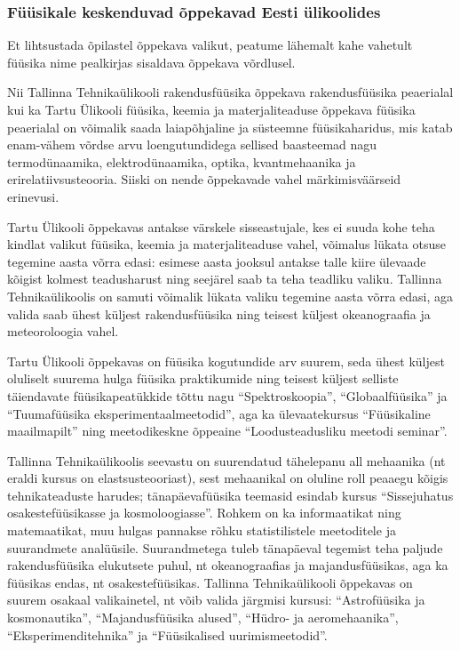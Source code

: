 \documentclass[11pt, twoside]{article}
\begin{document}
{{\subsubsection*{Füüsikale keskenduvad õppekavad Eesti ülikoolides}
Et lihtsustada õpilastel õppekava valikut, peatume lähemalt kahe vahetult füüsika nime pealkirjas sisaldava õppekava võrdlusel.

Nii Tallinna Tehnikaülikooli rakendusfüüsika õppekava rakendusfüüsika peaerialal kui ka Tartu Ülikooli füüsika, keemia ja materjaliteaduse õppekava füüsika
peaerialal on võimalik saada laiapõhjaline ja süsteemne füüsikaharidus, mis katab
enam-vähem võrdse arvu loengutundidega sellised baasteemad nagu termodünaamika, elektrodünaamika, optika,
kvantmehaanika ja erirelatiivsusteooria. Siiski on nende õppekavade vahel märkimisväärseid erinevusi.

Tartu Ülikooli õppekavas antakse värskele sisseastujale, kes ei suuda kohe teha kindlat valikut füüsika, keemia
ja materjaliteaduse vahel, võimalus lükata otsuse tegemine aasta võrra edasi: esimese aasta jooksul antakse talle
kiire ülevaade kõigist kolmest teadusharust ning seejärel saab ta teha teadliku valiku.
Tallinna Tehnikaülikoolis on samuti võimalik lükata valiku tegemine aasta võrra edasi, aga valida saab ühest küljest
rakendusfüüsika ning teisest küljest okeanograafia ja meteoroloogia vahel.

Tartu Ülikooli õppekavas on füüsika kogutundide arv suurem, seda ühest
küljest oluliselt suurema hulga füüsika praktikumide
ning teisest küljest selliste täiendavate füüsikapeatükkide tõttu nagu
``Spektroskoopia'', ``Globaalfüüsika''
ja ``Tuumafüüsika eksperimentaalmeetodid'', aga ka ülevaatekursus
``Füüsikaline maailmapilt'' ning meetodikeskne
õppeaine ``Loodusteadusliku meetodi seminar''.

Tallinna Tehnikaülikoolis seevastu on  suurendatud tähelepanu all
mehaanika (nt eraldi kursus on elastsusteooriast),
sest mehaanikal on oluline roll peaaegu kõigis tehnikateaduste
harudes; tänapäevafüüsika teemasid esindab kursus ``Sissejuhatus
osakestefüüsikasse ja kosmoloogiasse''. Rohkem on ka informaatikat ning
matemaatikat, muu hulgas pannakse rõhku statistilistele meetoditele ja
suurandmete analüüsile. Suurandmetega tuleb tänapäeval tegemist teha
paljude
rakendusfüüsika elukutsete puhul, nt okeanograafias ja majandusfüüsikas,
aga ka füüsikas endas, nt osakestefüüsikas.
Tallinna Tehnikaülikooli õppekavas on suurem osakaal valikainetel, nt
võib valida järgmisi kursusi:
``Astrofüüsika ja kosmonautika'', ``Majandusfüüsika alused'', ``Hüdro-
ja aeromehaanika'', ``Eksperimenditehnika'' ja
``Füüsikalised uurimismeetodid''.

}}
\end{document}
